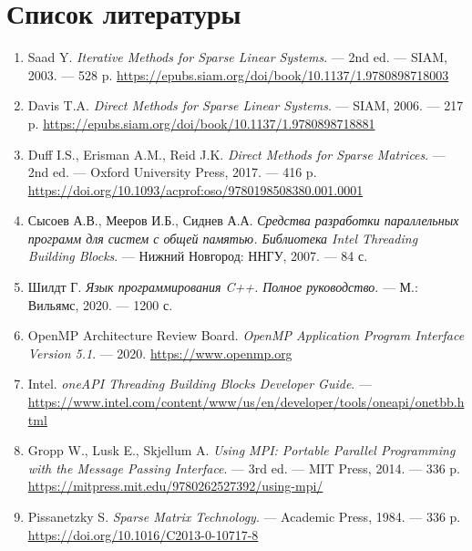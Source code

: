 \documentclass[12pt]{extarticle}
\begin{document}
\section{Список литературы}
\begin{enumerate}
    \item Saad Y. \textit{Iterative Methods for Sparse Linear Systems}. — 2nd ed. — SIAM, 2003. — 528 p. \url{https://epubs.siam.org/doi/book/10.1137/1.9780898718003}
    \item Davis T.A. \textit{Direct Methods for Sparse Linear Systems}. — SIAM, 2006. — 217 p. \url{https://epubs.siam.org/doi/book/10.1137/1.9780898718881}
    \item Duff I.S., Erisman A.M., Reid J.K. \textit{Direct Methods for Sparse Matrices}. — 2nd ed. — Oxford University Press, 2017. — 416 p. \url{https://doi.org/10.1093/acprof:oso/9780198508380.001.0001}
    \item Сысоев А.В., Мееров И.Б., Сиднев А.А. \textit{Средства разработки параллельных программ для систем с общей памятью. Библиотека Intel Threading Building Blocks}. — Нижний Новгород: ННГУ, 2007. — 84 с.
    \item Шилдт Г. \textit{Язык программирования C++. Полное руководство}. — М.: Вильямс, 2020. — 1200 с.
    \item OpenMP Architecture Review Board. \textit{OpenMP Application Program Interface Version 5.1}. — 2020. \url{https://www.openmp.org}
    \item Intel. \textit{oneAPI Threading Building Blocks Developer Guide}. — \url{https://www.intel.com/content/www/us/en/developer/tools/oneapi/onetbb.html}
    \item Gropp W., Lusk E., Skjellum A. \textit{Using MPI: Portable Parallel Programming with the Message Passing Interface}. — 3rd ed. — MIT Press, 2014. — 336 p. \url{https://mitpress.mit.edu/9780262527392/using-mpi/}
    \item Pissanetzky S. \textit{Sparse Matrix Technology}. — Academic Press, 1984. — 336 p. \url{https://doi.org/10.1016/C2013-0-10717-8}
\end{enumerate}
\end{document}
